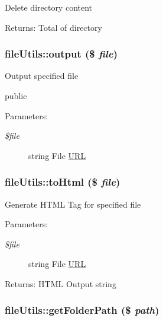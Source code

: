 Delete directory content

\begin{Desc}
\item[Returns:]Total of directory \end{Desc}
\hypertarget{classfileUtils_21bdf01e738dd00bac4f7ca4456b9db6}{
\subsubsection[output]{\setlength{\rightskip}{0pt plus 5cm}fileUtils::output (\$ {\em file})}}
\label{classfileUtils_21bdf01e738dd00bac4f7ca4456b9db6}


Output specified file

public \begin{Desc}
\item[Parameters:]
\begin{description}
\item[{\em \$file}]string File \hyperlink{classURL}{URL} \end{description}
\end{Desc}
\hypertarget{classfileUtils_273687343a0710d2ae8629308af0f4f6}{
\subsubsection[toHtml]{\setlength{\rightskip}{0pt plus 5cm}fileUtils::toHtml (\$ {\em file})}}
\label{classfileUtils_273687343a0710d2ae8629308af0f4f6}


Generate HTML Tag for specified file

\begin{Desc}
\item[Parameters:]
\begin{description}
\item[{\em \$file}]string File \hyperlink{classURL}{URL} \end{description}
\end{Desc}
\begin{Desc}
\item[Returns:]HTML Output string \end{Desc}
\hypertarget{classfileUtils_30432e38f6c0829d585c3d323899de52}{
\subsubsection[getFolderPath]{\setlength{\rightskip}{0pt plus 5cm}fileUtils::getFolderPath (\$ {\em path})}}
\label{classfileUtils_30432e38f6c0829d585c3d323899de52}


